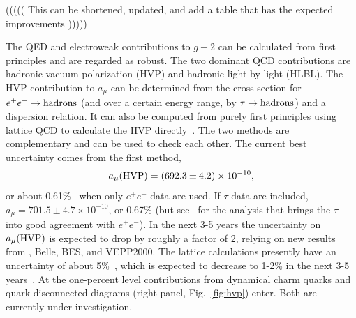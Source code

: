 








((((( This can be shortened, updated, and add a table that has the expected improvements )))))


The QED and electroweak contributions to $g-2$ can be calculated from first principles
and are regarded as robust.  The two dominant QCD contributions are hadronic vacuum polarization (HVP) and hadronic light-by-light (HLBL).
The HVP contribution to $a_\mu$ can be determined from the
cross-section for $e^+e^-\to\rm hadrons$ (and over a certain energy
range, by $\tau\to\rm hadrons$) and a dispersion relation. It can also
be computed from purely first principles using lattice QCD to
calculate the HVP directly~\cite{hep-lat/0212018}. The two methods are
complementary and can be used to check each other. The current best
uncertainty comes from the first method,
\begin{equation}
a_\mu(\rm HVP)=(692.3\pm4.2)\times 10^{-10},
\end{equation}
or about 0.61\%~\cite{arXiv:1010.4180} when only $e^+e^-$ data are used. 
If $\tau$ data are included, $a_\mu=701.5\pm4.7\times 10^{-10}$, or 0.67\% 
(but see~\cite{arXiv:1101.2872} for the analysis that brings the $\tau$ 
into good agreement with $e^+e^-$). In the next 3-5 years the uncertainty on 
$a_\mu(\rm HVP)$ is expected to drop by roughly a factor of 2, relying 
on new results from {\babar}, Belle, BES, and VEPP2000.
The lattice calculations presently have an uncertainty of 
about 5\%~\cite{hep-lat/0608011, arXiv:1103.4818, Boyle:2011hu,  DellaMorte:2011aa}, which is 
expected to decrease to 1-2\% in the next 3-5 years~\cite{USQCD}. At the 
one-percent level contributions from dynamical charm quarks and quark-disconnected 
diagrams (right panel, Fig.~\ref{fig:hvp}) enter. Both are currently under investigation.
%
